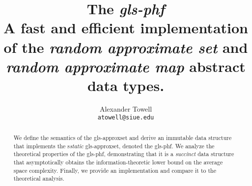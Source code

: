 \documentclass[11pt,final,hidelinks]{article}
\title
{
    The \emph{\gls*{gls-phf}}\\
    \large A fast and efficient implementation of the \emph{random approximate set} and \emph{random approximate map} abstract data types.
}
\author
{
    Alexander Towell\\
    \texttt{atowell@siue.edu}
}
\date{}
\begin{document}
\maketitle
\begin{abstract}
We define the semantics of the \gls*{gls-approxset} and derive an immutable data structure that implements the s\emph{static} \gls*{gls-approxset}, denoted the \gls*{gls-phf}. We analyze the theoretical properties of the \gls*{gls-phf}, demonstrating that it is a \emph{succinct} data structure that asymptotically obtains the information-theoretic lower bound on the average space complexity. Finally, we provide an implementation and compare it to the theoretical analysis.
\end{abstract}

\tableofcontents
\listoffigures
\listofalgorithms



%






\printglossary

\end{document}

